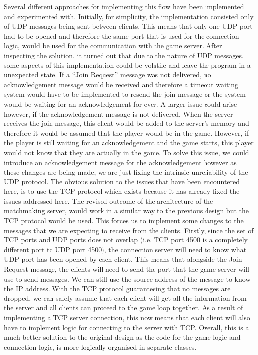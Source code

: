 Several different approaches for implementing this flow have been implemented and experimented with. Initially, for simplicity, the implementation consisted only of UDP messages being sent between clients. This means that only one UDP port had to be opened and therefore the same port that is used for the connection logic, would be used for the communication with the game server. After inspecting the solution, it turned out that due to the nature of UDP messages, some aspects of this implementation could be volatile and leave the program in a unexpected state. If a ``Join Request'' message was not delivered, no acknowledgement message would be received and therefore a timeout waiting system would have to be implemented to resend the join message or the system would be waiting for an acknowledgement for ever. A larger issue could arise however, if the acknowledgement message is not delivered. When the server receives the join message, this client would be added to the server's memory and therefore it would be assumed that the player would be in the game. However, if the player is still waiting for an acknowledgement and the game starts, this player would not know that they are actually in the game. To solve this issue, we could introduce an acknowledgement message for the acknowledgement however as these changes are being made, we are just fixing the intrinsic unreliability of the UDP protocol.
The obvious solution to the issues that have been encountered here, is to use the TCP protocol which exists because it has already fixed the issues addressed here.
The revised outcome of the architecture of the matchmaking server, would work in a similar way to the previous design but the TCP protocol would be used. This forces us to implement some changes to the messages that we are expecting to receive from the clients. Firstly, since the set of TCP ports and UDP ports does not overlap (i.e. TCP port 4500 is a completely different port to UDP port 4500), the connection server will need to know what UDP port has been opened by each client. This means that alongside the Join Request message, the clients will need to send the port that the game server will use to send messages. We can still use the source address of the message to know the IP address. With the TCP protocol guaranteeing that no messages are dropped, we can safely assume that each client will get all the information from the server and all clients can proceed to the game loop together. As a result of implementing a TCP server connection, this now means that each client will also have to implement logic for connecting to the server with TCP.
Overall, this is a much better solution to the original design as the code for the game logic and connection logic, is more logically organised in separate classes.


